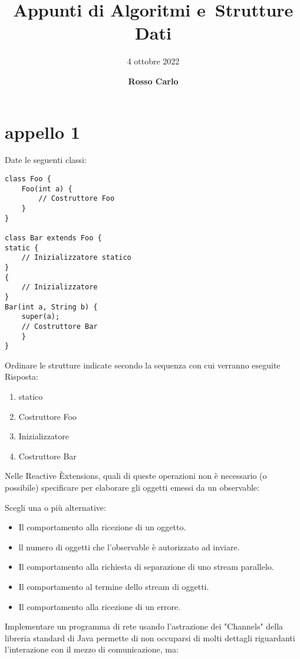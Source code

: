 \documentclass{article}
\title{\vspace{2cm}\textbf{Appunti di Algoritmi e\ Strutture Dati}}
\author{\vspace{3mm}4 ottobre 2022}
\date{\vspace{3mm} \textbf{Rosso Carlo}}
\begin{document}
\begin{titlepage}
	\maketitle
	\thispagestyle{empty}
\end{titlepage}
\tableofcontents
\newpage

\section{appello 1}

Date le seguenti classi:
\begin{lstlisting}
class Foo {
    Foo(int a) {
        // Costruttore Foo
    }
}

class Bar extends Foo {
static {
    // Inizializzatore statico
}
{
    // Inizializzatore
}
Bar(int a, String b) {
    super(a);
    // Costruttore Bar
    }
}
\end{lstlisting}

Ordinare le strutture indicate secondo la sequenza con cui verranno eseguite
Risposta:
\begin{enumerate}
	\item statico
	\item Costruttore Foo
	\item Inizializzatore
	\item Costruttore Bar
\end{enumerate}

Nelle Reactive Èxtensions, quali di queste operazioni non è necessario (o possibile) specificare per elaborare gli oggetti emessi da un observable:

Scegli una o più alternative:

\begin{itemize}
	\item Il comportamento alla ricezione di un oggetto.
	\item ll numero di oggetti che l'observable è autorizzato ad inviare. 
		\checkmark
	\item Il comportamento alla richiesta di separazione di uno stream 
		parallelo. \checkmark
	\item Il comportamento al termine dello stream di oggetti.
	\item Il comportamento alla ricezione di un errore.
\end{itemize}

Implementare un programma di rete usando l'astrazione dei "Channels" della libreria standard di Java permette di non occuparsi di molti dettagli riguardanti
l'interazione con il mezzo di comunicazione, ma:
\end{document}
